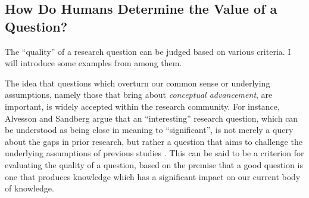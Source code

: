 


\subsection{How Do Humans Determine the Value of a Question?}

The ``quality'' of a research question can be judged based on various criteria. I will introduce some examples from among them.

The idea that questions which overturn our common sense or underlying assumptions, namely those that bring about \textit{conceptual advancement}, are important, is widely accepted within the research community. For instance, Alvesson and Sandberg argue that an ``interesting'' research question, which can be understood as being close in meaning to ``significant'', is not merely a query about the gaps in prior research, but rather a question that aims to challenge the underlying assumptions of previous studies \cite{alvesson2013constructing}. 
This can be said to be a criterion for evaluating the quality of a question, based on the premise that a good question is one that produces knowledge which has a significant impact on our current body of knowledge.


